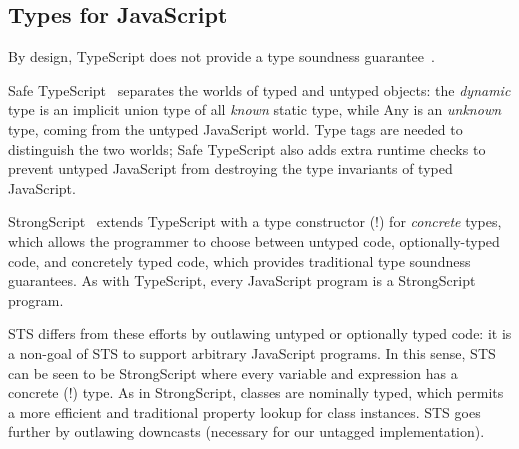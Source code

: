 








\subsection{Types for JavaScript}

By design, TypeScript does not provide a type soundness guarantee~\cite{BiermanAT14}.

Safe TypeScript~\cite{SafeTypeScript15} separates the worlds of typed and untyped
objects: the \emph{dynamic} type is an implicit union type of all \emph{known} static type,
while Any is an \emph{unknown} type, coming from the untyped JavaScript world. Type tags
are needed to distinguish the two worlds; Safe TypeScript also adds extra runtime checks
to prevent untyped JavaScript from destroying the type invariants of typed JavaScript.

StrongScript~\cite{StrongScriptECOOP15} extends TypeScript with a type constructor (!)
for \emph{concrete} types, which allows the programmer to choose between untyped
code, optionally-typed code, and concretely typed code, which provides traditional
type soundness guarantees. As with TypeScript, every JavaScript program is a StrongScript program.

STS differs from these efforts by outlawing untyped or optionally typed
code: it is a non-goal of STS to support arbitrary JavaScript programs.
In this sense, STS can be seen to be StrongScript where every variable and
expression has a concrete (!) type. As in StrongScript, classes are nominally typed,
which permits a more efficient and traditional property lookup for class instances.
STS goes further by outlawing downcasts (necessary for our untagged
implementation).

